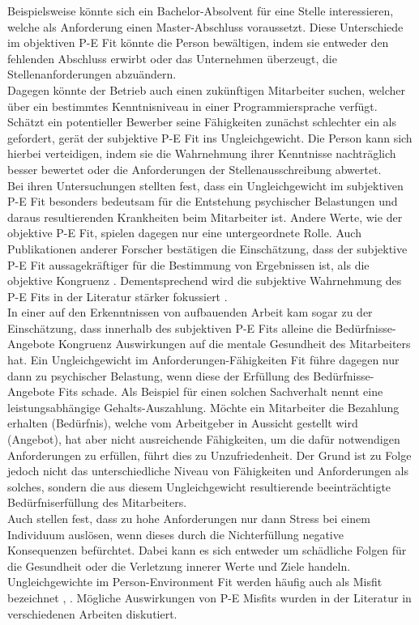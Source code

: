 Beispielsweise könnte sich ein Bachelor-Absolvent für eine Stelle interessieren, welche als Anforderung einen Master-Abschluss voraussetzt. Diese Unterschiede im objektiven P-E Fit könnte die Person bewältigen, indem sie entweder den fehlenden Abschluss erwirbt oder das Unternehmen überzeugt, die Stellenanforderungen abzuändern.\\
Dagegen könnte der Betrieb auch einen zukünftigen Mitarbeiter suchen, welcher über ein bestimmtes Kenntnisniveau in einer Programmiersprache verfügt. Schätzt ein potentieller Bewerber seine Fähigkeiten zunächst schlechter ein als gefordert, gerät der subjektive P-E Fit ins Ungleichgewicht. Die Person kann sich hierbei verteidigen, indem sie die Wahrnehmung ihrer Kenntnisse nachträglich besser bewertet oder die Anforderungen der Stellenausschreibung abwertet.\\
Bei ihren Untersuchungen stellten \textcite{copingAndAdaption:1974} fest, dass ein Ungleichgewicht im subjektiven P-E Fit besonders bedeutsam für die Entstehung psychischer Belastungen und daraus resultierenden Krankheiten beim Mitarbeiter ist. Andere Werte, wie der objektive P-E Fit, spielen dagegen nur eine untergeordnete Rolle. Auch Publikationen anderer Forscher bestätigen die Einschätzung, dass der subjektive P-E Fit aussagekräftiger für die Bestimmung von Ergebnissen ist, als die objektive Kongruenz \cite[S. 3]{carless:2005}. Dementsprechend wird die subjektive Wahrnehmung des P-E Fits in der Literatur stärker fokussiert \cite[S. 8]{caplan:1987}\cite[S. 9]{caplan:1993}\cite[S. 16]{choi:2004}.\\
In einer auf den Erkenntnissen von \textcite{copingAndAdaption:1974} aufbauenden Arbeit kam \textcite{harrison:1978} sogar zu der Einschätzung, dass innerhalb des subjektiven P-E Fits alleine die Bedürfnisse-Angebote Kongruenz Auswirkungen auf die mentale Gesundheit des Mitarbeiters hat. Ein Ungleichgewicht im Anforderungen-Fähigkeiten Fit führe dagegen nur dann zu psychischer Belastung, wenn diese der Erfüllung des Bedürfnisse-Angebote Fits schade. Als Beispiel für einen solchen Sachverhalt nennt \textcite{harrison:1978} eine leistungsabhängige Gehalts-Auszahlung. Möchte ein Mitarbeiter die Bezahlung erhalten (Bedürfnis), welche vom Arbeitgeber in Aussicht gestellt wird (Angebot), hat aber nicht ausreichende Fähigkeiten, um die dafür notwendigen Anforderungen zu erfüllen, führt dies zu Unzufriedenheit. Der Grund ist \textcite{harrison:1978} zu Folge jedoch nicht das unterschiedliche Niveau von Fähigkeiten und Anforderungen als solches, sondern die aus diesem Ungleichgewicht resultierende beeinträchtigte Bedürfniserfüllung des Mitarbeiters.\\
Auch \textcite[S. 1ff.]{lazarus:1978} stellen fest, dass zu hohe Anforderungen nur dann Stress bei einem Individuum auslösen, wenn dieses durch die Nichterfüllung negative Konsequenzen befürchtet. Dabei kann es sich entweder um schädliche Folgen für die Gesundheit oder die Verletzung innerer Werte und Ziele handeln.\\
Ungleichgewichte im Person-Environment Fit werden häufig auch als Misfit bezeichnet \cite[S. 2]{edwards:2004}, \cite[S. 4]{kristof:1996}. Mögliche Auswirkungen von P-E Misfits wurden in der Literatur in verschiedenen Arbeiten diskutiert.

